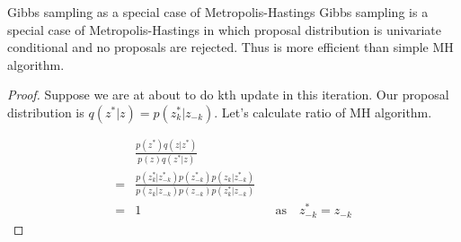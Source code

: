 \documentclass[pdf]{beamer}
\begin{document}
\begin{frame}{Gibbs sampling as a special case of Metropolis-Hastings}
  Gibbs sampling is a special case of Metropolis-Hastings in which proposal distribution is univariate conditional and no proposals are rejected. Thus is more efficient than simple MH algorithm.

  \begin{proof}
    Suppose we are at about to do kth update in this iteration. Our proposal distribution is $q(z^*|z) = p(z_k^*|z_{-k})$. Let's calculate ratio of MH algorithm.

    \begin{align*}
      & \frac{p(z^*) q(z|z^*)}{p(z) q(z^*|z)} \\
      =& \frac{p(z_k^*|z_{-k}^*) p(z_{-k}^*) p(z_k|z_{-k}^*) }{p(z_k|z_{-k}) p(z_{-k}) p(z_k^*|z_{-k}) } \\
      =& 1 && \text{as} \quad z_{-k}^* = z_{-k} 
    \end{align*}
  \end{proof}

\end{frame}
\end{document}
